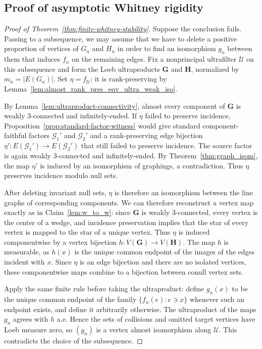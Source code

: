 \documentclass{article}
\theoremstyle{plain}
\theoremstyle{definition}
\newcommand{\cG}{\mathcal{G}}
\newcommand{\cU}{\mathcal{U}}
\begin{document}
\subsection{Proof of asymptotic Whitney rigidity}


\begin{proof}[Proof of Theorem~\ref{thm:finite-whitney-stability}]
Suppose the conclusion fails. Passing to a subsequence, we may assume that we have to delete a positive proportion of vertices of $G_n$ and $H_n$ in order to find an isomorphism $g_n$ between them that induces $f_n$ on the remaining edges. Fix a nonprincipal ultrafilter $\cU$ on this subsequence and form the Loeb ultraproducts $\mathbf G$ and $\mathbf H$, normalized by $m_n=|E(G_n)|$. Set $\eta = f_{\cU}$; it is rank-preserving by Lemma~\ref{lem:almost_rank_pres_eqv_ultra_weak_iso}.

By Lemma~\ref{lem:ultraproduct-connectivity}, almost every component of $\mathbf G$ is weakly $3$-connected and infinitely-ended. If $\eta$ failed to preserve incidence, Proposition~\ref{prop:standard-factor-witness} would give standard component-faithful factors $\cG_1'$ and $\cG_2'$ and a rank-preserving edge bijection $\eta':E(\cG_1')\to E(\cG_2')$ that still failed to preserve incidence. The source factor is again weakly $3$-connected and infinitely-ended. By Theorem~\ref{thm:graph_isom}, the map $\eta'$ is induced by an isomorphism of graphings, a contradiction. Thus $\eta$ preserves incidence modulo null sets.

After deleting invariant null sets, $\eta$ is therefore an isomorphism between the line graphs of corresponding components.  We can therefore reconstruct a vertex map exactly as in Claim~\ref{lem:w_to_w}: since $\mathbf{G}$ is weakly $3$-connected, every vertex is the center of a wedge, and incidence preservation implies that the star of every vertex is mapped to the star of a unique vertex. Thus $\eta$ is induced componentwise by a vertex bijection $h:V(\mathbf G)\to V(\mathbf H)$. The map $h$ is measurable, as $h(x)$ is the unique common endpoint of the images of the edges incident with $x$. Since $\eta$ is an edge bijection and there are no isolated vertices, these componentwise maps combine to a bijection between conull vertex sets.

Apply the same finite rule before taking the ultraproduct: define $g_n(x)$ to be the unique common endpoint of the family $\{f_n(e):e\ni x\}$ whenever such an endpoint exists, and define it arbitrarily otherwise. The ultraproduct of the maps $g_n$ agrees with $h$ a.e. Hence the sets of collisions and omitted target vertices have Loeb measure zero, so $(g_n)$ is a vertex almost isomorphism along $\cU$. %
This contradicts the choice of the subsequence.
\end{proof}
\end{document}
